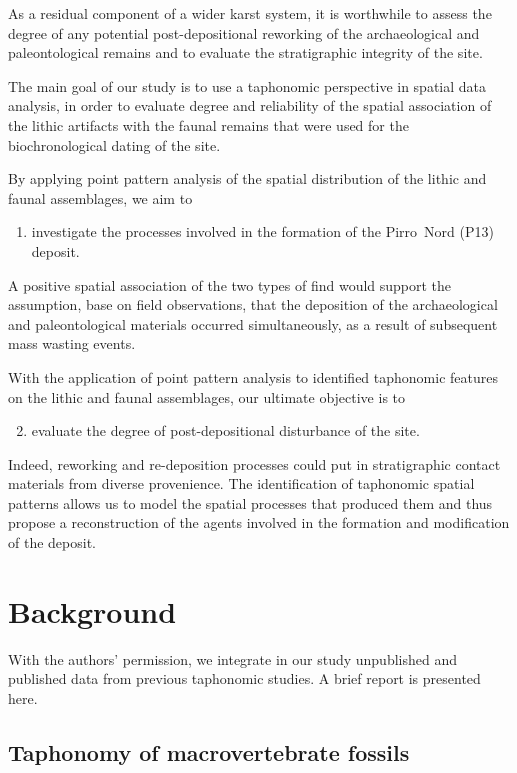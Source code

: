 \documentclass[5p,authoryear]{elsarticle} %
\begin{document}
As a residual component of a wider karst system, it is worthwhile to assess the degree of any potential post-depositional reworking of the archaeological and paleontological remains and to evaluate the stratigraphic integrity of the site. 

The main goal of our study is to use a taphonomic perspective in spatial data analysis, in order to evaluate degree and reliability of the spatial association of the lithic artifacts with the faunal remains that were used for the biochronological dating of the site.

By applying point pattern analysis of the spatial distribution of the lithic and faunal assemblages, we aim to
\begin{enumerate}
  \item investigate the processes involved in the formation of the Pirro~Nord (P13) deposit.
\end{enumerate}
A positive spatial association of the two types of find would support the assumption, base on field observations, that the deposition of the archaeological and paleontological materials occurred simultaneously, as a result of subsequent mass wasting events.

With the application of point pattern analysis to identified taphonomic features on the lithic and faunal assemblages, our ultimate objective is to 
\begin{enumerate}
  \setcounter{enumi}{1}
  \item evaluate the degree of post-depositional disturbance of the site.
\end{enumerate}
Indeed, reworking and re-deposition processes could put in stratigraphic contact materials from diverse provenience. The identification of taphonomic spatial patterns allows us to model the spatial processes that produced them and thus propose a reconstruction of the agents involved in the formation and modification of the deposit.

\section{Background}

With the authors' permission, we integrate in our study unpublished \citep{Bagnus2011} and published \citep{Arzarello2012,Arzarello2015} data from previous taphonomic studies. A brief report is presented here.

\subsection{Taphonomy of macrovertebrate fossils}
\end{document}
